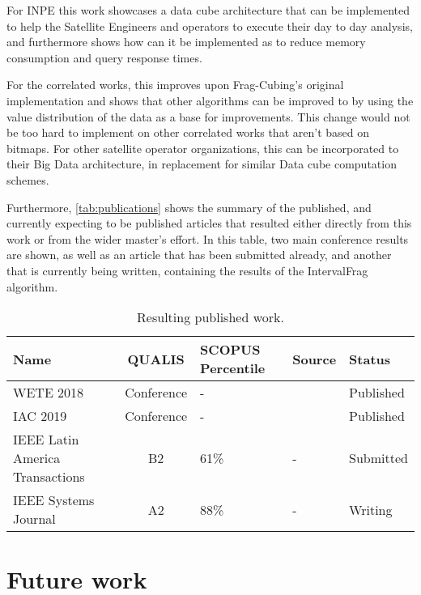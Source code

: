 For INPE this work showcases a data cube architecture that can be implemented to help the Satellite Engineers and operators to execute their day to day analysis, and furthermore shows how can it be implemented as to reduce memory consumption and query response times.

For the correlated works, this improves upon Frag-Cubing's original implementation and shows that other algorithms can be improved to by using the value distribution of the data as a base for improvements.
This change would not be too hard to implement on other correlated works that aren't based on bitmaps.
For other satellite operator organizations, this can be incorporated to their Big Data architecture, in replacement for similar Data cube computation schemes.

Furthermore, \autoref{tab:publications} shows the summary of the published, and currently expecting to be published articles that resulted either directly from this work or from the wider master's effort.
In this table, two main conference results are shown, as well as an article that has been submitted already, and another that is currently being written, containing the results of the IntervalFrag algorithm.

\begin{table}[!htb]
  \begin{center}
    \caption{Resulting published work.}\label{tab:publications}
    \begin{tabular}{|C{2.3cm}|c|C{2.2cm}|C{2.4cm}|C{2.9cm}|}
      \hline
      \textbf{Name} &\bfseries QUALIS & \bfseries SCOPUS Percentile & \bfseries Source &\bfseries Status \\
      \hline
      WETE 2018 & Conference & - & \cite{PereiraFerrSilv:2018:StApOL} & Published \\
      \hline
      IAC 2019 & Conference & - & \cite{pereiraLessonsLearnedSystems2019} & Published \\
      \hline
      IEEE Latin America Transactions & B2 & 61\% & - & Submitted \\
      \hline
      IEEE Systems Journal & A2 & 88\% & - & Writing \\
      \hline
    \end{tabular}
  \end{center}
\end{table}

\section{Future work}\label{ch:concl:future}

